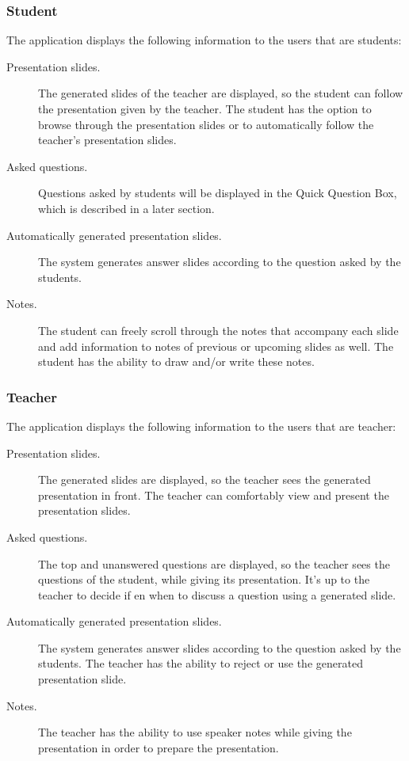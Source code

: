 \documentclass[11pt]{article}
\begin{document}
\subsubsection{Student}
The application displays the following information to the users that are students:
\begin{description}
\item[Presentation slides.] The generated slides of the teacher are displayed, so the student can follow the presentation given by the teacher. The student has the option to browse through the presentation slides or to automatically follow the teacher's presentation slides.
\item[Asked questions.] Questions asked by students will be displayed in the Quick Question Box, which is described in a later section. %
\item[Automatically generated presentation slides.] The system generates answer slides according to the question asked by the students.
\item[Notes.] The student can freely scroll through the notes that accompany each slide and add information to notes of previous or upcoming slides as well. The student has the ability to draw and/or write these notes.
\end{description}
\subsubsection{Teacher}
The application displays the following information to the users that are teacher:
\begin{description}
\item[Presentation slides.] The generated slides are displayed, so the teacher sees the generated presentation in front. The teacher can comfortably view and present the presentation slides.
\item[Asked questions.] The top and unanswered questions are displayed, so the teacher sees the questions of the student, while giving its presentation. It's up to the teacher to decide if en when to discuss a question using a generated slide. 
\item[Automatically generated presentation slides.] The system generates answer slides according to the question asked by the students. The teacher has the ability to reject or use the generated presentation slide.
\item[Notes.] The teacher has the ability to use speaker notes while giving the presentation in order to prepare the presentation.
\end{description}
\end{document}
